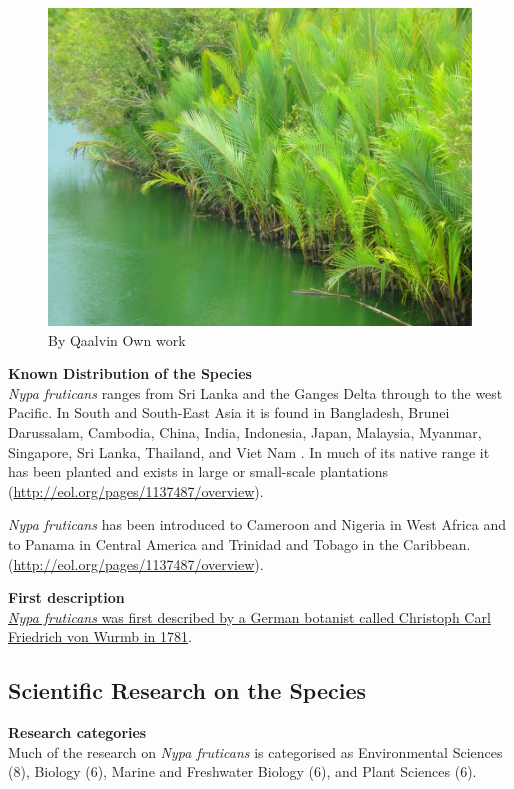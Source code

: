 \documentclass[]{book}
\theoremstyle{definition}
\theoremstyle{definition}
\theoremstyle{definition}
\theoremstyle{remark}
\begin{document}
\begin{figure}
\centering
\includegraphics{images_species/Nipa_palms.jpg}
\caption{By Qaalvin Own work}
\end{figure}

\textbf{Known Distribution of the Species}\\
\emph{Nypa fruticans} ranges from Sri Lanka and the Ganges Delta through
to the west Pacific. In South and South-East Asia it is found in
Bangladesh, Brunei Darussalam, Cambodia, China, India, Indonesia, Japan,
Malaysia, Myanmar, Singapore, Sri Lanka, Thailand, and Viet Nam . In
much of its native range it has been planted and exists in large or
small-scale plantations (\url{http://eol.org/pages/1137487/overview}).

\emph{Nypa fruticans} has been introduced to Cameroon and Nigeria in
West Africa and to Panama in Central America and Trinidad and Tobago in
the Caribbean. (\url{http://eol.org/pages/1137487/overview}).

\textbf{First description}\\
\href{https://www.gbif.org/species/2738422}{\emph{Nypa fruticans} was
first described by a German botanist called Christoph Carl Friedrich von
Wurmb in 1781}.

\hypertarget{scientific-research-on-the-species-1}{%
\subsection{Scientific Research on the
Species}\label{scientific-research-on-the-species-1}}

\textbf{Research categories}\\
Much of the research on \emph{Nypa fruticans} is categorised as
Environmental Sciences (8), Biology (6), Marine and Freshwater Biology
(6), and Plant Sciences (6).
\end{document}
